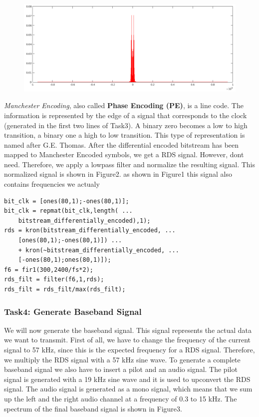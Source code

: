\documentclass[sigconf]{acmart}
\begin{document}
\begin{figure}[tb!]
	\includegraphics[width=1\linewidth]{rds_filt_plot.png}
	\caption{}
	\label{fig:rds_filt_plot}
\end{figure}

\emph{Manchester Encoding}, also called
\protect\hypertarget{Phaseux20Encodingux20ux28PEux29}{}{}\textbf{Phase
Encoding (PE)}, is a line code. The information is represented by the
edge of a signal that corresponds to the clock (generated in the first
two lines of Task3). A binary zero becomes a low to high transition, a
binary one a high to low transition. This type of representation is
named after G.E. Thomas. After the differential encoded bitstream has
been mapped to Manchester Encoded symbols, we get a RDS signal. However,
dont need. Therefore, we apply a lowpass filter and normalize the
resulting signal. This normalized signal is shown in Figure2.
as shown in Figure1 this signal also contains frequencies we actualy

\begin{verbatim}
bit_clk = [ones(80,1);-ones(80,1)];
bit_clk = repmat(bit_clk,length( ...
    bitstream_differentially_encoded),1);
rds = kron(bitstream_differentially_encoded, ...
    [ones(80,1);-ones(80,1)]) ...
    + kron(~bitstream_differentially_encoded, ...
    [-ones(80,1);ones(80,1)]);
f6 = fir1(300,2400/fs*2);
rds_filt = filter(f6,1,rds);
rds_filt = rds_filt/max(rds_filt);
\end{verbatim}

\hypertarget{Task4:ux20Generateux20Basebandux20Signal}{%
\subsubsection{Task4: Generate Baseband
Signal}\label{Task4:ux20Generateux20Basebandux20Signal}}

We will now generate the baseband signal. This signal represents the
actual data we want to transmit. First of all, we have to change the
frequency of the current signal to 57 kHz, since this is the expected
frequency for a RDS signal. Therefore, we multiply the RDS signal with a
57 kHz sine wave. To generate a complete baseband signal we also have to
insert a pilot and an audio signal. The pilot signal is generated with a
19 kHz sine wave and it is used to upconvert the RDS signal. The audio
signal is generated as a mono signal, which means that we sum up the
left and the right audio channel at a frequency of 0.3 to 15 kHz. The
spectrum of the final baseband signal is shown in Figure3.
\end{document}
